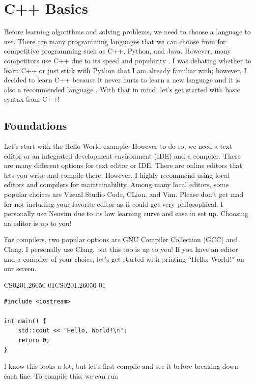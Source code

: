 \documentclass[../../../main.tex]{subfiles}
\begin{document}
\chapter{C++ Basics}

Before learning algorithms and solving problems, we need to choose
a language to use. There are many programming languages that we can
choose from for competitive programming such as C++, Python, and Java.
However, many competitors use C++ due to its speed and popularity
\cite{CS02-2}. I was debating whether to learn C++ or just stick with
Python that I am already familiar with; however, I decided to learn
C++ because it never hurts to learn a new language and it is also a
recommended language \cite{CS02-3}. With that in mind, let's get
started with basic syntax from C++!

\section{Foundations}

Let's start with the Hello World example. However to do so, we need
a text editor or an integrated development environment (IDE) and a
compiler. There are many different options for text editor or IDE.
There are online editors that lets you write and compile there.
However, I highly recommend using local editors and compilers for
maintainability. Among many local editors, some popular choices
are Visual Studio Code, CLion, and Vim. Please don't get mad for not
including your favorite editor as it could get very philosophical.
I personally use Neovim due to its low learning curve and ease in
set up. Choosing an editor is up to you!

For compilers, two popular options are GNU Compiler Collection (GCC)
and Clang. I personally use Clang, but this too is up to you!
If you have an editor and a compiler of your choice, let's get
started with printing ``Hello, World!'' on our screen.

\begin{cppbox}{CS0201.26050-01}{CS0201.26050-01}
\begin{lstlisting}[style=cppstyle]
#include <iostream>

int main() {
    std::cout << "Hello, World!\n";
    return 0;
}
\end{lstlisting}
\end{cppbox}

I know this looks a lot, but let's first compile and see it before
breaking down each line. To compile this, we can run
\end{document}
